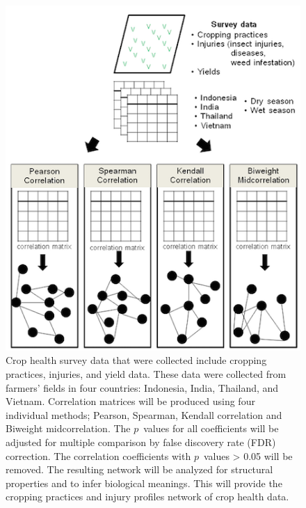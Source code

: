 \begin{figure}
\centering
\centerline{\includegraphics[width = 5in]{pipeline}}
\caption[Proposed method for constructing network]{Crop health survey data that were collected include cropping practices, injuries, and yield data. These data were collected from farmers' fields in four countries: Indonesia, India, Thailand, and Vietnam. Correlation matrices will be produced using four individual methods; Pearson, Spearman, Kendall correlation and Biweight midcorrelation. The $p$~values for all coefficients will be adjusted for multiple comparison by false discovery rate (FDR) correction. The correlation coefficients with $p$~values > 0.05 will be removed. The resulting network will be analyzed for structural properties and to infer biological meanings. This will provide the cropping practices and injury profiles network of crop health data.}
\end{figure}

